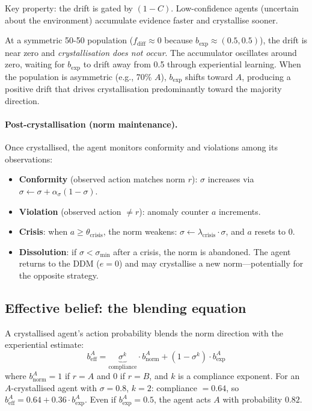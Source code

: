 \documentclass[11pt,a4paper]{article}
\begin{document}
Key property: the drift is gated by $(1 - C)$. Low-confidence agents (uncertain about the environment) accumulate evidence faster and crystallise sooner.

At a symmetric 50-50 population ($f_{\mathrm{diff}} \approx 0$ because $b_{\exp} \approx (0.5, 0.5)$), the drift is near zero and \emph{crystallisation does not occur}. The accumulator oscillates around zero, waiting for $b_{\exp}$ to drift away from 0.5 through experiential learning. When the population is asymmetric (e.g., 70\% $A$), $b_{\exp}$ shifts toward $A$, producing a positive drift that drives crystallisation predominantly toward the majority direction.

\paragraph{Post-crystallisation (norm maintenance).} Once crystallised, the agent monitors conformity and violations among its observations:
\begin{itemize}[nosep]
\item \textbf{Conformity} (observed action matches norm $r$): $\sigma$ increases via $\sigma \leftarrow \sigma + \alpha_\sigma(1 - \sigma)$.
\item \textbf{Violation} (observed action $\neq r$): anomaly counter $a$ increments.
\item \textbf{Crisis}: when $a \geq \theta_{\mathrm{crisis}}$, the norm weakens: $\sigma \leftarrow \lambda_{\mathrm{crisis}} \cdot \sigma$, and $a$ resets to 0.
\item \textbf{Dissolution}: if $\sigma < \sigma_{\min}$ after a crisis, the norm is abandoned. The agent returns to the DDM ($e = 0$) and may crystallise a new norm---potentially for the opposite strategy.
\end{itemize}

\subsection{Effective belief: the blending equation}
\label{sec:blend}

A crystallised agent's action probability blends the norm direction with the experiential estimate:
\begin{equation}
b_{\mathrm{eff}}^A = \underbrace{\sigma^k}_{\text{compliance}} \cdot b_{\mathrm{norm}}^A + (1 - \sigma^k) \cdot b_{\exp}^A
\label{eq:beff}
\end{equation}
where $b_{\mathrm{norm}}^A = 1$ if $r = A$ and $0$ if $r = B$, and $k$ is a compliance exponent. For an $A$-crystallised agent with $\sigma = 0.8$, $k = 2$: compliance $= 0.64$, so $b_{\mathrm{eff}}^A = 0.64 + 0.36 \cdot b_{\exp}^A$. Even if $b_{\exp}^A = 0.5$, the agent acts $A$ with probability $0.82$.
\end{document}
